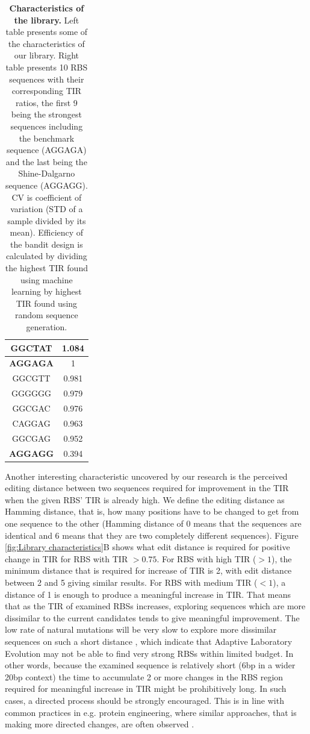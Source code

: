 \documentclass{article}
\begin{document}
\begin{table}[!h]
\begin{minipage}[c]{0.38\textwidth}
\begin{tabular}{|c|c|}
GGCTAT                & 1.084              \\ \hline
\textbf{AGGAGA}                & 1                  \\ \hline
GGCGTT                & 0.981            \\ \hline
GGGGGG                & 0.979             \\ \hline
GGCGAC                & 0.976             \\ \hline
CAGGAG                & 0.963             \\ \hline
GGCGAG                & 0.952             \\ \hline
\textbf{AGGAGG}                & 0.394            \\ \hline
\end{tabular}
\end{minipage}
\caption{\textbf{Characteristics of the library.}
Left table presents some of the characteristics of our library.
Right table presents 10 RBS sequences with their corresponding TIR ratios, the first 9 being the strongest sequences including the benchmark sequence (AGGAGA) and the last being the Shine-Dalgarno sequence (AGGAGG).
CV is coefficient of variation (STD of a sample divided by its mean).
Efficiency of the bandit design is calculated by dividing the highest TIR found using machine learning by highest TIR found using random sequence generation. }
\end{table}

Another interesting characteristic uncovered by our research is the perceived editing distance between two sequences required for  improvement in the TIR when the given RBS' TIR is already high. 
We define the editing distance as Hamming distance, that is, how many positions have to be changed to get from one sequence to the other (Hamming distance of 0 means that the sequences are identical and 6 means that they are two completely different sequences).
Figure \ref{fig:Library characteristics}B shows what edit distance is required for positive change in TIR for RBS with TIR $>0.75$.
For RBS with high TIR ($>1$), the minimum distance that is required for increase of TIR is 2, with edit distance between 2 and 5 giving similar results.
For RBS with medium TIR ($<1$), a distance of 1 is enough to produce a meaningful increase in TIR.
That means that as the TIR of examined RBSs increases, exploring sequences which are more dissimilar to the current candidates tends to give meaningful improvement. 
The low rate of natural mutations will be very slow to explore more dissimilar sequences on such a short distance \cite{Lee2012},
which indicate that Adaptive Laboratory Evolution may not be able to find very strong RBSs within limited budget.  
In other words, because the examined sequence is relatively short (6bp in a wider 20bp context) the time to accumulate 2 or more changes in the RBS region required for meaningful increase in TIR might be prohibitively long.
In such cases, a directed process should be strongly encouraged.
This is in line with common practices in e.g. protein engineering, where similar approaches, that is making more directed changes, are often observed \cite{Jackel2008}.
\end{document}
